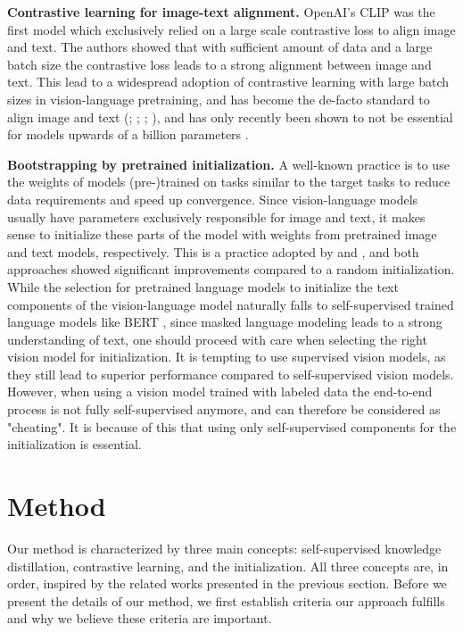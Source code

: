 \documentclass[10pt]{article} %
\begin{document}
\textbf{Contrastive learning for image-text alignment.}
OpenAI's CLIP \citep{clip} was the first model which exclusively relied on a large scale contrastive loss to align image and text.
The authors showed that with sufficient amount of data and a large batch size the contrastive loss leads to a strong alignment
between image and text. This lead to a widespread adoption of contrastive learning with large batch sizes in vision-language
pretraining, and has become the de-facto standard to align image and text (\citet{coca}; \citet{vlmo}; \citet{flava}; \citet{filip}),
and has only recently been shown to not be essential for models upwards of a billion parameters \citep{beit3}.

\textbf{Bootstrapping by pretrained initialization.} A well-known practice is to use the weights of models (pre-)trained on tasks
similar to the target tasks to reduce data requirements and speed up convergence. Since vision-language models usually have parameters
exclusively responsible for image and text, it makes sense to initialize these parts of the model with weights from pretrained image and
text models, respectively. This is a practice adopted by \cite{vlmo} and \cite{flava}, and both approaches showed significant improvements
compared to a random initialization. While the selection for pretrained language models to initialize the text components of the vision-language
model naturally falls to self-supervised trained language models like BERT \citep{bert}, since masked language modeling leads to a strong
understanding of text, one should proceed with care when selecting the right vision model for initialization. It is tempting to use
supervised vision models, as they still lead to superior performance compared to self-supervised vision models. However, when using
a vision model trained with labeled data the end-to-end process is not fully self-supervised anymore, and can therefore be considered as
"cheating". It is because of this that using only self-supervised components for the initialization is essential.

\section{Method}
Our method is characterized by three main concepts: self-supervised knowledge distillation, contrastive learning, and the initialization. All
three concepts are, in order, inspired by the related works presented in the previous section. Before we present the details of our method,
we first establish criteria our approach fulfills and why we believe these criteria are important.
\end{document}
